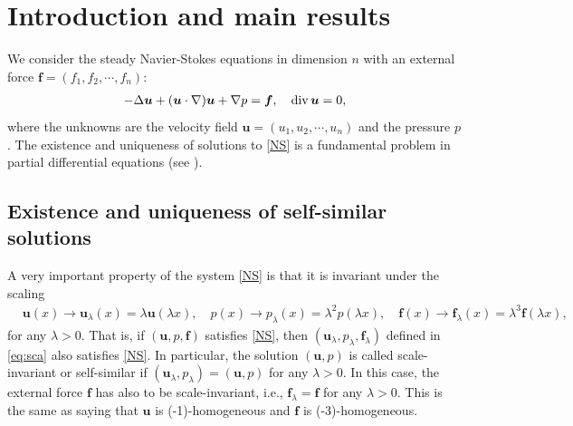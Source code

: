 \documentclass[12pt]{amsart}
\renewcommand{\div}{{\rm div \thinspace }}
\newcommand{\Bu}{{\boldsymbol{u}}}
\newcommand{\Bf}{{\boldsymbol{f}}}
\begin{document}
	
	
	
	
	
	
	
	
	\maketitle
	
	\section{Introduction and main results}
	We consider the steady Navier-Stokes equations  in  dimension $n$ with an  external force $\Bf=(f_1, f_2,\cdots, f_n)$:
	\begin{align} \label{NS}
		-\Delta \Bu + (\Bu\cdot \nabla )\Bu + \nabla p=\boldsymbol {f}, \quad \div \Bu=0,
	\end{align}
	where  the unknowns are the velocity field $\Bu=(u_1, u_2, \cdots, u_n)$ and the  pressure $p$. The existence and uniqueness of solutions to \eqref{NS} is a fundamental problem in partial differential equations (see \cite{Galdi11}).
	
	\subsection{Existence and uniqueness of self-similar solutions}
	
	
	
	A very important property of the  system \eqref{NS} is that it is invariant under the scaling	\begin{equation}\label{eq:sca}
		\begin{aligned}
			&\Bu (x) \to \Bu_{\lambda} (x) = \lambda \Bu (\lambda x),\quad 
			p(x) \to p_{\lambda}(x)= \lambda^2p(\lambda x),\quad 
			\boldsymbol {f}(x)\to \Bf_{\lambda}(x)= \lambda^3\boldsymbol {f}(\lambda x),
		\end{aligned}
	\end{equation}
	for any $\lambda>0$. That is, if $(\Bu,p,\Bf)$ satisfies \eqref{NS}, then $(\Bu_\lambda,p_\lambda,\Bf_\lambda)$ defined in \eqref{eq:sca} also satisfies \eqref{NS}.
	In particular, the solution $(\Bu,p)$  is called    scale-invariant or self-similar if
	$(\Bu_{\lambda},p_{\lambda})= (\Bu,p)$   for any $\lambda > 0$. In this case, 
	the external force $\Bf$ has also to be scale-invariant,  i.e., 
	$\Bf_{\lambda}= \boldsymbol {f}$ for any $\lambda > 0$. 
	This is the same as saying that  $\Bu$ is (-1)-homogeneous and $\Bf$ is (-3)-homogeneous. 
	
\end{document}
